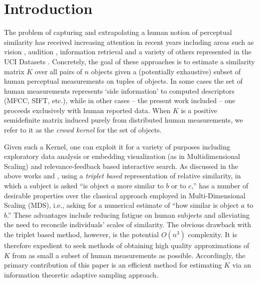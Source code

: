 \documentclass{article}
\begin{document}
\section{Introduction}
The problem of capturing and extrapolating a human notion of
perceptual similarity has received increasing attention in recent
years including areas such as vision \cite{Agarwal07}, audition \cite{McFee09}, information
retrieval \cite{Schultz03} and a variety of others represented in the
UCI Datasets \cite{Xing02,Huang10}.  Concretely, the goal of these
approaches is to estimate a similarity matrix $K$ over all pairs of
$n$ objects given a (potentially exhaustive) subset of human
perceptual measurements on tuples of objects.  In some cases the set
of human measurements represents `side information' to computed
descriptors (MFCC, SIFT, etc.), while in other cases -- the present
work included -- one proceeds exclusively with human reported data.  
When $K$ is a positive semidefinite matrix induced purely from distributed human
measurements, we refer to it as the {\em crowd kernel} for the set of
objects.

Given such a Kernel, one can exploit it for a variety of purposes
including exploratory data analysis or embedding visualization (as in
Multidimensional Scaling) and relevance-feedback based interactive
search.  As discussed in the above works and \cite{Kendall90}, using a
{\em triplet based} representation of relative similarity, in which a
subject is asked ``is object $a$ more similar to $b$ or to $c$,'' has
a number of desirable properties over the classical approach employed
in Multi-Dimensional Scaling (MDS), i.e., asking for a numerical estimate of ``how similar is
object $a$ to $b$.''  These advantages include reducing fatigue on
human subjects and alleviating the need to reconcile individuals'
scales of similarity.  The obvious drawback with the triplet
based method, however, is the potential $O(n^3)$ complexity.  It is
therefore expedient to seek methods of obtaining high quality
approximations of $K$ from as small a subset of human measurements as
possible.   Accordingly, the primary contribution of this paper is an 
efficient method for estimating $K$ via an information theoretic 
adaptive sampling approach.
\end{document}
